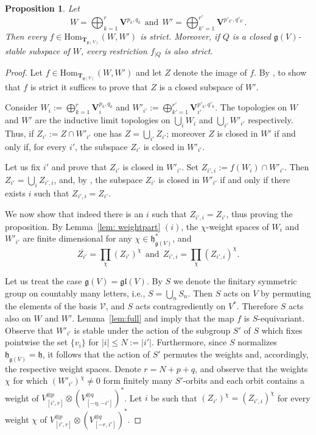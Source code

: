 \documentclass[12pt,reqno]{amsart}
\newcommand{\Hom}{\mathrm{Hom}}
\newtheorem{prop}[thm]{Proposition}
\theoremstyle{definition}
\theoremstyle{remark}
\begin{document}
        \begin{prop}\label{prop:strict}
	    Let $$W = \bigoplus_{k=1}^r \mathbf{V}^{p_k , q_k} \ \ \mathrm{and} 
	    \ \ W' = \bigoplus_{k'=1}^{r'} \mathbf{V}^{p'_{k'} , q'_{k'}}. $$
	    Then every $f\in\Hom_{\mathbf{T}_{\mathfrak{g}(V)}}(W, W')$ is strict.
	    Moreover, if $Q$ is a closed $\mathfrak{g}(V)$-stable subspace of $W$, every restriction $f_{|Q}$ is also strict.
	\end{prop}
        \begin{proof}
        Let $f\in\Hom_{\mathbf{T}_{\mathfrak{g}(V)}}(W, W')$ and let $Z$ denote the image of $f$. 
        By \cite[Lemma~2.10]{EP}, to show that $f$ is strict it suffices to prove that $Z$ is a closed subspace of $W'$. 
	
	Consider 
 $W_{i} := \bigoplus_{k=1}^r \mathbf{V}_{i} ^{p_k, q_k}$
  and 
  $W'_{i'} := \bigoplus_{k'=1}^{r'} \mathbf{V}_{i'} ^{p'_k, q'_k}$. 
 The topologies on $W$ and $W'$ are the inductive limit topologies on $\bigcup_{i} W_{i}$ and $\bigcup_{i'} W'_{i'}$ respectively. Thus, if $Z_{i'} := Z \cap W'_{i'}$ one has $Z = \bigcup_{i'} Z_{i'}$; moreover $Z$ is closed in $W'$ if and only if, for every $i'$, the subspace $Z_{i'}$ is closed in 
 $W'_{i'}$.
	
	Let us fix $i'$ and prove that $Z_{i'}$ is closed in $W'_{i'}$. Set $Z_{i', i}:=f(W_{i})\cap W'_{i'}$. Then $Z_{i'} = \bigcup_{i} Z_{i', i}$, and, by \cite[Lemma~2.3 $(iii)$]{EP}, the subspace $Z_{i'}$ is closed in $W'_{i'}$ if and only if there exists $i$ such that $Z_{i', i} = Z_{i'}$.
	
	We now show that indeed there is an $i$ such that $Z_{i', i} = Z_{i'}$, thus proving the proposition. By Lemma~\ref{lem: weightpart} $(i)$, the $\chi$-weight spaces of $W_{i}$ and $W'_{i'}$ are finite dimensional for any $\chi\in\mathfrak{h}_{\mathfrak{g}(V)}^\ast$, and
	$$
	\overline{Z_{i'}}= \prod_\chi (Z_{i'})^\chi  \ \ \mathrm{and} \ \ Z_{i', i} =\prod_\chi (Z_{i', i})^\chi.
	$$
 
 
 




 Let us treat the case $\mathfrak{g}(V) = \mathfrak{gl}(V)$.
	By $S$ we denote the finitary symmetric group on countably many letters, i.e., $S=\bigcup_n S_n$.
	Then $S$ acts on $V$ by permuting the elements of the basis $\mathcal{V}$, and $S$ acts contragrediently on $V^\ast$. Therefore $S$ acts also on $W$ and $W'$. Lemma~\ref{lem:full} and \cite[Lemma 6.1]{DPS} imply that the map $f$ is $S$-equivariant. Observe that $W'_{i'}$ is stable under the action of the subgroup $S'$ of $S$ which  fixes pointwise the set 
$\{v_i \}$ for $|i| \leq N := |i'| $.
Furthermore, since $S$ normalizes $\mathfrak{h}_{\mathfrak{g}(V)} = \mathfrak{h}$, it follows that the action of $S'$ permutes the weights and, accordingly, the respective weight spaces. Denote $r = N + p + q$, 
and observe that the weights $\chi$ for which $(W'_{i'})^{\chi}\neq 0$ form finitely many $S'$-orbits and each orbit contains a weight of 
 $V_{[i', r]} ^{\otimes p}
     \otimes 
     (V_{[-\eta, -i']} ^{\otimes q})^*$. 
     Let $i$ be such that $(Z_{i'})^\chi = (Z_{i', i})^\chi$ for every weight $\chi$ of 
	$V_{[i', r]} ^{\otimes p}
     \otimes 
     (V_{[-r, i']} ^{\otimes q})^*$.
	

\end{proof}
\end{document}
